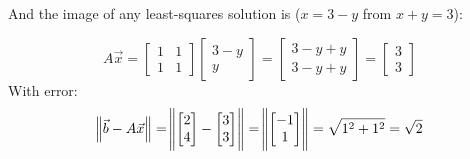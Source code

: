 \documentclass[12pt, letterpaper]{article}
\theoremstyle{statement}
\theoremstyle{statement}
\begin{document}
    And the image of any least-squares solution is ($x=3-y$ from $x+y=3$): 
    
    $$
    A\Vec{x}=
    \begin{bmatrix}
    1 & 1 \\ 
    1 & 1
    \end{bmatrix}
    \begin{bmatrix}
    3 - y \\ 
    y
    \end{bmatrix}
    =
    \begin{bmatrix}
    3-y+y \\
    3-y+y
    \end{bmatrix}
    =\begin{bmatrix}
    3\\3
    \end{bmatrix}
    $$
    With error:
    $$
    \norm{\Vec{b}-A\Vec{x}} 
    =
    \norm{
    \begin{bmatrix} 
    2 \\
    4 
    \end{bmatrix}
    -
    \begin{bmatrix}
    3 \\
    3
    \end{bmatrix}
    }
    =
    \norm{
    \begin{bmatrix}
    -1 \\
    1
    \end{bmatrix}
    }
    =
    \sqrt{1^2+1^2}
    = \sqrt{2}
    $$
\end{document}
